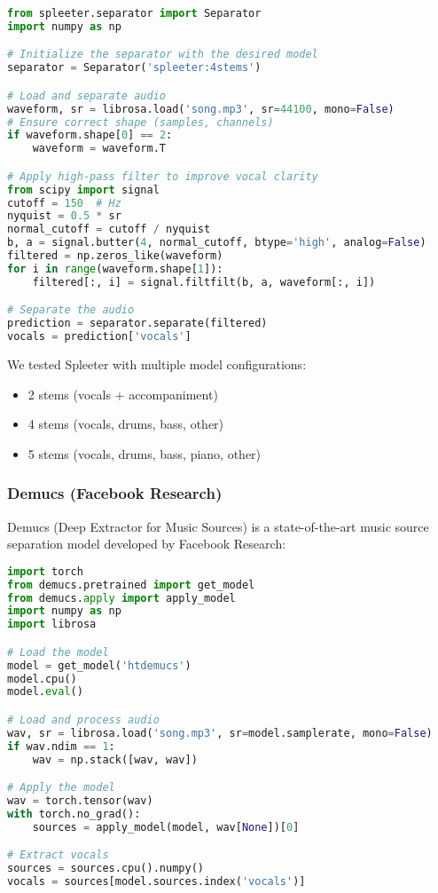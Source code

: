 \documentclass[conference]{IEEEtran}
\begin{document}
\begin{lstlisting}[language=Python]
from spleeter.separator import Separator
import numpy as np

# Initialize the separator with the desired model
separator = Separator('spleeter:4stems')

# Load and separate audio
waveform, sr = librosa.load('song.mp3', sr=44100, mono=False)
# Ensure correct shape (samples, channels)
if waveform.shape[0] == 2:
    waveform = waveform.T

# Apply high-pass filter to improve vocal clarity
from scipy import signal
cutoff = 150  # Hz
nyquist = 0.5 * sr
normal_cutoff = cutoff / nyquist
b, a = signal.butter(4, normal_cutoff, btype='high', analog=False)
filtered = np.zeros_like(waveform)
for i in range(waveform.shape[1]):
    filtered[:, i] = signal.filtfilt(b, a, waveform[:, i])

# Separate the audio
prediction = separator.separate(filtered)
vocals = prediction['vocals']
\end{lstlisting}

We tested Spleeter with multiple model configurations:
\begin{itemize}
    \item 2 stems (vocals + accompaniment)
    \item 4 stems (vocals, drums, bass, other)
    \item 5 stems (vocals, drums, bass, piano, other)
\end{itemize}

\subsubsection{Demucs (Facebook Research)}
Demucs (Deep Extractor for Music Sources) \cite{defossez2019demucs} is a state-of-the-art music source separation model developed by Facebook Research:

\begin{lstlisting}[language=Python]
import torch
from demucs.pretrained import get_model
from demucs.apply import apply_model
import numpy as np
import librosa

# Load the model
model = get_model('htdemucs')
model.cpu()
model.eval()

# Load and process audio
wav, sr = librosa.load('song.mp3', sr=model.samplerate, mono=False)
if wav.ndim == 1:
    wav = np.stack([wav, wav])

# Apply the model
wav = torch.tensor(wav)
with torch.no_grad():
    sources = apply_model(model, wav[None])[0]

# Extract vocals
sources = sources.cpu().numpy()
vocals = sources[model.sources.index('vocals')]
\end{lstlisting}
\end{document}
